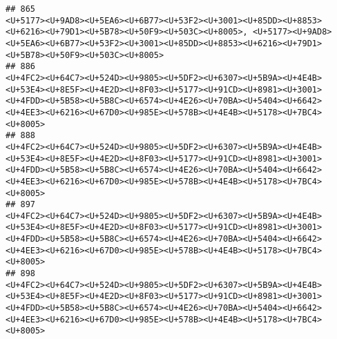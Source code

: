 \documentclass[
]{article}
\begin{document}
\begin{verbatim}
## 865                                                                                                                                                                                                                                                                                                                                 <U+5177><U+9AD8><U+5EA6><U+6B77><U+53F2><U+3001><U+85DD><U+8853><U+6216><U+79D1><U+5B78><U+50F9><U+503C><U+8005>, <U+5177><U+9AD8><U+5EA6><U+6B77><U+53F2><U+3001><U+85DD><U+8853><U+6216><U+79D1><U+5B78><U+50F9><U+503C><U+8005>
## 886                                                                                                                                                                                                                                                                                           <U+4FC2><U+64C7><U+524D><U+9805><U+5DF2><U+6307><U+5B9A><U+4E4B><U+53E4><U+8E5F><U+4E2D><U+8F03><U+5177><U+91CD><U+8981><U+3001><U+4FDD><U+5B58><U+5B8C><U+6574><U+4E26><U+70BA><U+5404><U+6642><U+4EE3><U+6216><U+67D0><U+985E><U+578B><U+4E4B><U+5178><U+7BC4><U+8005>
## 888                                                                                                                                                                                                                                                                                           <U+4FC2><U+64C7><U+524D><U+9805><U+5DF2><U+6307><U+5B9A><U+4E4B><U+53E4><U+8E5F><U+4E2D><U+8F03><U+5177><U+91CD><U+8981><U+3001><U+4FDD><U+5B58><U+5B8C><U+6574><U+4E26><U+70BA><U+5404><U+6642><U+4EE3><U+6216><U+67D0><U+985E><U+578B><U+4E4B><U+5178><U+7BC4><U+8005>
## 897                                                                                                                                                                                                                                                                                           <U+4FC2><U+64C7><U+524D><U+9805><U+5DF2><U+6307><U+5B9A><U+4E4B><U+53E4><U+8E5F><U+4E2D><U+8F03><U+5177><U+91CD><U+8981><U+3001><U+4FDD><U+5B58><U+5B8C><U+6574><U+4E26><U+70BA><U+5404><U+6642><U+4EE3><U+6216><U+67D0><U+985E><U+578B><U+4E4B><U+5178><U+7BC4><U+8005>
## 898                                                                                                                                                                                                                                                                                           <U+4FC2><U+64C7><U+524D><U+9805><U+5DF2><U+6307><U+5B9A><U+4E4B><U+53E4><U+8E5F><U+4E2D><U+8F03><U+5177><U+91CD><U+8981><U+3001><U+4FDD><U+5B58><U+5B8C><U+6574><U+4E26><U+70BA><U+5404><U+6642><U+4EE3><U+6216><U+67D0><U+985E><U+578B><U+4E4B><U+5178><U+7BC4><U+8005>

\end{verbatim}
\end{document}
